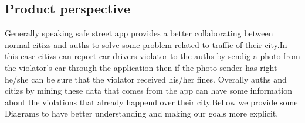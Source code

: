 \documentclass{article}
\begin{document}
	\subsection{Product perspective} Generally speaking safe street app provides a better collaborating between normal citizs and auths to solve some problem related to traffic of their city.In this case citizs can report car drivers violator to the auths by sendig a photo from the violator's car through the application then if the photo sender has right he/she can be sure that the violator received his/her fines. Overally auths and citizs by mining these data that comes from the app can have some information about the violations that already happend over their city.Bellow we provide some Diagrams to have better understanding and making our goals more explicit.
\end{document}
